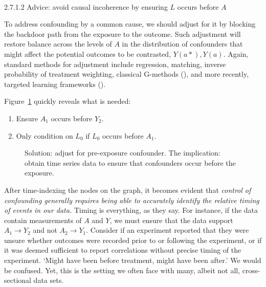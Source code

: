\documentclass[
  singlecolumn]{article}
\makeatletter
\let\oldparagraph\paragraph
\renewcommand{\paragraph}{
    \@ifstar
      \xxxParagraphStar
      \xxxParagraphNoStar
  }
\newcommand{\xxxParagraphStar}[1]{\oldparagraph*{#1}\mbox{}}
\newcommand{\xxxParagraphNoStar}[1]{\oldparagraph{#1}\mbox{}}
\providecommand{\tightlist}{%
  \setlength{\itemsep}{0pt}\setlength{\parskip}{0pt}}\usepackage{longtable,booktabs,array}
\makeatother
\begin{document}
\paragraph{\texorpdfstring{2.7.1.2 Advice: avoid causal incoherence by
ensuring \(L\) occurs before
\(A\)}{2.7.1.2 Advice: avoid causal incoherence by ensuring L occurs before A}}\label{advice-avoid-causal-incoherence-by-ensuring-l-occurs-before-a}

To address confounding by a common cause, we should adjust for it by
blocking the backdoor path from the exposure to the outcome. Such
adjustment will restore balance across the levels of \(A\) in the
distribution of confounders that might affect the potential outcomes to
be contrasted, \(Y(a*), Y(a)\). Again, standard methods for adjustment
include regression, matching, inverse probability of treatment
weighting, classical G-methods (), and more recently, targeted learning frameworks
().

Figure~\ref{fig-dag-common-cause-solution} quickly reveals what is
needed:

\begin{enumerate}
\def\labelenumi{\arabic{enumi}.}
\tightlist
\item
  Ensure \(A_1\) occurs before \(Y_2\).
\item
  Only condition on \(L_0\) if \(L_0\) occurs before \(A_1\).
\end{enumerate}

\begin{figure}


\caption{\label{fig-dag-common-cause-solution}Solution: adjust for
pre-exposure confounder. The implication: obtain time series data to
ensure that confounders occur before the exposure.}

\end{figure}%

After time-indexing the nodes on the graph, it becomes evident that
\emph{control of confounding generally requires being able to accurately
identify the relative timing of events in our data.} Timing is
everything, as they say. For instance, if the data contain measurements
of \(A\) and \(Y\), we must ensure that the data support \(A_1\to Y_2\)
and not \(A_2 \to Y_1\). Consider if an experiment reported that they
were unsure whether outcomes were recorded prior to or following the
experiment, or if it was deemed sufficient to report correlations
without precise timing of the experiment. `Might have been before
treatment, might have been after.' We would be confused. Yet, this is
the setting we often face with many, albeit not all, cross-sectional
data sets.
\end{document}
